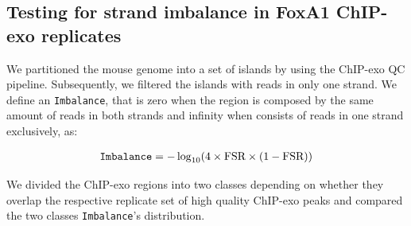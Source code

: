 \documentclass{bmcart}
\newcommand{\SK}[1]{\textcolor{red}{SK: #1}}
\begin{document}


\subsection*{Testing for strand imbalance in FoxA1 ChIP-exo replicates}


\color{blue}

We partitioned the mouse genome into a set of islands by using the
ChIP-exo QC pipeline. Subsequently, we filtered the islands with reads
in only one strand. We define an \texttt{Imbalance}, that is
zero when the region is composed by the same amount of reads in both
strands and infinity when consists of reads in one strand exclusively,
as:

\begin{align*}
  \text{\texttt{Imbalance}} = -\log_{10} (4 \times \mbox{FSR}
  \times (1 - \mbox{FSR}))
\end{align*}

We divided the ChIP-exo regions into two classes depending on whether
they overlap the respective replicate set of high quality ChIP-exo
peaks and compared the two classes \texttt{Imbalance}'s distribution.
\end{document}
